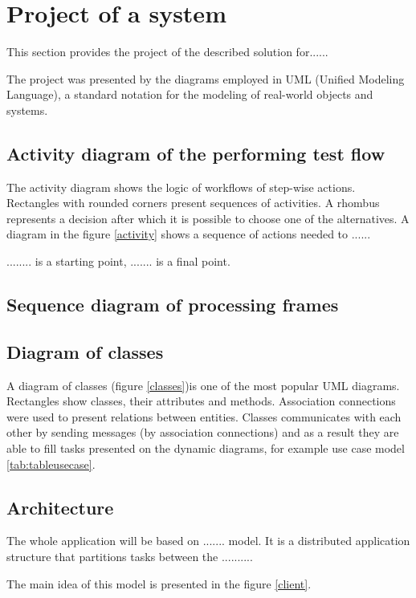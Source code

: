  
\section{Project of a system}
\label{project}
This section provides the project of the described solution for......

 The project was presented by the diagrams employed in UML (Unified Modeling Language), a standard notation for the modeling of real-world objects and systems. 
 
\subsection{Activity diagram of the performing test flow}
The activity diagram shows the logic of workflows of step-wise actions. Rectangles with rounded corners present sequences of activities. A rhombus represents a decision after which it is possible to choose one of the alternatives. A diagram in the figure \ref{activity} shows a sequence of actions needed to ......

........ is a starting point, ....... is a final point. 


\subsection{Sequence diagram of processing frames}



\subsection{Diagram of classes}
A diagram of classes (figure \ref{classes})is one of the most popular UML diagrams. Rectangles show classes, their attributes and methods. Association connections were used to present relations between entities. Classes communicates with each other by sending messages (by association connections) and as a result they are able to fill tasks presented on the dynamic diagrams, for example use case model \ref{tab:tableusecase}.

 
  

\subsection{Architecture}
The whole application will be based on ....... model. It is a distributed application structure that partitions tasks between the ..........


The main idea of this model is presented in the figure \ref{client}.
 
